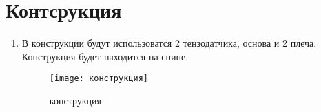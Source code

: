 \section{Контсрукция}
\begin{enumerate}

\item В конструкции будут использоватся 2 тензодатчика, основа и 2 плеча. Конструкция будет находится на спине.

	\begin{figure}[h]
		\centering
		\texttt{[image: конструкция]}
		\caption{конструкция}
	\end{figure}

\end{enumerate} 
